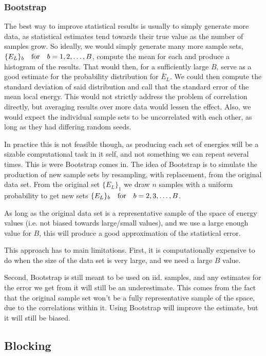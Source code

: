 \documentclass[twocolumn]{article}
\begin{document}
\subsubsection{Bootstrap}
The best way to improve statistical results is usually to simply generate more
data, as statistical estimates tend towards their true value as the number of
samples grow. So ideally, we would simply generate many more sample sets,
$\{E_L\}_b \qfor b=1, 2, \dots, B$, compute the mean for each and produce a
histogram of the results. That would then, for a sufficiently large $B$, serve as
a good estimate for the probability distribution for $\bar E_L$. We could then
compute the standard deviation of said distribution and call that the standard
error of the mean local energy. This would not strictly address the problem of
correlation directly, but averaging results over more data would lessen the
effect. Also, we would expect the individual sample sets to be uncorrelated with
each other, as long as they had differing random seeds.

In practice this is not feasible though, as producing each set of energies will be a
sizable computational task in it self, and not something we can repeat several
times. This is were Bootstrap comes in. The idea of Bootstrap is to simulate
the production of new sample sets by resampling, with replacement, from the
original data set. From the original set $\{E_L\}_1$ we draw $n$ samples with a
uniform probability to get new sets $\{E_L\}_b\qfor b = 2,3,\dots,B$.

As long as the original data set is a representative sample of the space of
energy values (i.e. not biased towards large/small values), and we use a large
enough value for $B$, this will produce a good approximation of the statistical
error. 

This approach has to main limitations. First, it is computationally
expensive to do when the size of the data set is very large, and we need a large
$B$ value.

Second, Bootstrap is still meant to be used on iid. samples, and any estimates
for the error we get from it will still be an underestimate. This comes from the
fact that the original sample set won't be a fully representative sample of the
space, due to the correlations within it. Using Bootstrap will improve the
estimate, but it will still be biased.


\subsection{Blocking}
\end{document}
